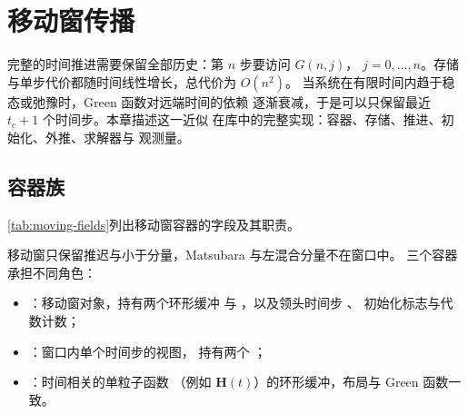 \chapter{移动窗传播}
\label{ch:moving}

完整的时间推进需要保留全部历史：第 $n$ 步要访问 $G(n,j)$，
$j=0,\dots,n$。存储与单步代价都随时间线性增长，总代价为 $O(n^2)$。
当系统在有限时间内趋于稳态或弛豫时，Green 函数对远端时间的依赖
逐渐衰减，于是可以只保留最近 $t_c+1$ 个时间步。本章描述这一近似
在库中的完整实现：容器、存储、推进、初始化、外推、求解器与
观测量。

\section{容器族}
\label{sec:moving-types}

\cref{tab:moving-fields}列出移动窗容器的字段及其职责。

移动窗只保留推迟与小于分量，Matsubara 与左混合分量不在窗口中。
三个容器承担不同角色：
\begin{itemize}
    \item {}：移动窗对象，持有两个环形缓冲
           与 ，以及领头时间步 、
          初始化标志与代数计数；
    \item {}：窗口内单个时间步的视图，
          持有两个 ；
    \item {}：时间相关的单粒子函数
          （例如 $\bm{H}(t)$）的环形缓冲，布局与 Green 函数一致。
\end{itemize}

